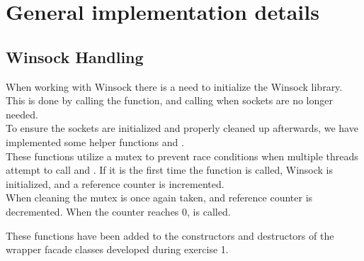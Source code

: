 \documentclass[Main]{subfiles}
\begin{document}
\section{General implementation details}

\subsection{Winsock Handling}
When working with Winsock there is a need to initialize the Winsock library.
This is done by calling the  function, and calling  when sockets are no longer needed.\\
To ensure the sockets are initialized and properly cleaned up afterwards, 
we have implemented some helper functions  and .\\
These functions utilize a mutex to prevent race conditions when multiple threads attempt to call  and .
If it is the first time the function is called, Winsock is initialized, and a reference counter is incremented.\\
When cleaning the mutex is once again taken, and reference counter is decremented. When the counter reaches 0,  is called.

These functions have been added to the constructors and destructors of the wrapper facade classes developed during exercise 1.
\end{document}
